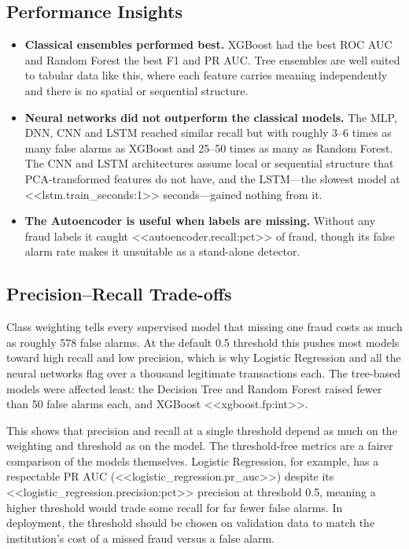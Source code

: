\documentclass[journal]{IEEEtran}
\begin{document}
\subsection{Performance Insights}
\begin{itemize}
  \item \textbf{Classical ensembles performed best.} XGBoost had the best ROC AUC and Random Forest the best F1 and PR AUC. Tree ensembles are well suited to tabular data like this, where each feature carries meaning independently and there is no spatial or sequential structure.
  \item \textbf{Neural networks did not outperform the classical models.} The MLP, DNN, CNN and LSTM reached similar recall but with roughly 3--6 times as many false alarms as XGBoost and 25--50 times as many as Random Forest. The CNN and LSTM architectures assume local or sequential structure that PCA-transformed features do not have, and the LSTM---the slowest model at <<lstm.train_seconds:1>> seconds---gained nothing from it.
  \item \textbf{The Autoencoder is useful when labels are missing.} Without any fraud labels it caught <<autoencoder.recall:pct>> of fraud, though its false alarm rate makes it unsuitable as a stand-alone detector.
\end{itemize}

\subsection{Precision--Recall Trade-offs}
Class weighting tells every supervised model that missing one fraud costs as much as roughly 578 false alarms. At the default 0.5 threshold this pushes most models toward high recall and low precision, which is why Logistic Regression and all the neural networks flag over a thousand legitimate transactions each. The tree-based models were affected least: the Decision Tree and Random Forest raised fewer than 50 false alarms each, and XGBoost <<xgboost.fp:int>>.

This shows that precision and recall at a single threshold depend as much on the weighting and threshold as on the model. The threshold-free metrics are a fairer comparison of the models themselves. Logistic Regression, for example, has a respectable PR AUC (<<logistic_regression.pr_auc>>) despite its <<logistic_regression.precision:pct>> precision at threshold 0.5, meaning a higher threshold would trade some recall for far fewer false alarms. In deployment, the threshold should be chosen on validation data to match the institution's cost of a missed fraud versus a false alarm.
\end{document}
